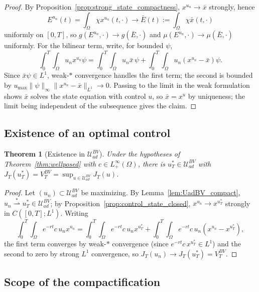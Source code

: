 \documentclass[pdflatex,sn-mathphys-num]{sn-jnl}
\newcommand{\Om}{\Omega}
\newcommand{\UadBV}{\mathcal{U}_{ad}^{BV}}
\theoremstyle{plain}
\newtheorem{theorem}{Theorem}[section]
\theoremstyle{definition}
\theoremstyle{remark}
\begin{document}
\begin{proof}
By Proposition~\ref{prop:strong_state_compactness}, $x^{u_n}\to\bar x$ strongly,
hence
\[
E^{u_n}(t)=\int_\Om\chi x^{u_n}(t,\cdot)
\longrightarrow
\bar E(t):=\int_\Om\chi\bar x(t,\cdot)
\]
uniformly on $[0,T]$, so $g(E^{u_n},\cdot)\to g(\bar E,\cdot)$ and
$\mu(E^{u_n},\cdot)\to\mu(\bar E,\cdot)$ uniformly. For the bilinear term, write,
for bounded $\psi$,
\[
\int_0^T\!\!\int_\Om u_n x^{u_n}\psi
=
\int_0^T\!\!\int_\Om u_n\bar x\,\psi
+\int_0^T\!\!\int_\Om u_n(x^{u_n}-\bar x)\psi.
\]
Since $\bar x\psi\in L^1$, weak-$\ast$ convergence handles the first term; the
second is bounded by $u_{\max}\|\psi\|_\infty\|x^{u_n}-\bar x\|_{L^1}\to0$. Passing
to the limit in the weak formulation shows $\bar x$ solves the state equation with
control $u$, so $\bar x=x^u$ by uniqueness; the limit being independent of the
subsequence gives the claim.
\end{proof}

\subsection{Existence of an optimal control}
\label{subsec:optimal_existence}

\begin{theorem}[Existence in $\UadBV$]
\label{thm:optimal_existence_BV}
Under the hypotheses of Theorem~\ref{thm:wellposed} with $c\in L^\infty_+(\Om)$,
there is $u_T^*\in\UadBV$ with
$J_T(u_T^*)=V_T^{BV}=\sup_{u\in\UadBV}J_T(u)$.
\end{theorem}

\begin{proof}
Let $(u_n)\subset\UadBV$ be maximizing. By Lemma~\ref{lem:UadBV_compact},
$u_n\overset{\ast}{\rightharpoonup}u_T^*\in\UadBV$; by
Proposition~\ref{prop:control_state_closed}, $x^{u_n}\to x^{u_T^*}$ strongly in
$C([0,T];L^1)$. Writing
\[
\int_0^T\!\!\int_\Om e^{-rt}c\,u_n x^{u_n}
=\int_0^T\!\!\int_\Om e^{-rt}c\,u_n x^{u_T^*}
+\int_0^T\!\!\int_\Om e^{-rt}c\,u_n(x^{u_n}-x^{u_T^*}),
\]
the first term converges by weak-$\ast$ convergence (since
$e^{-rt}c\,x^{u_T^*}\in L^1$) and the second to zero by strong $L^1$ convergence,
so $J_T(u_n)\to J_T(u_T^*)=V_T^{BV}$.
\end{proof}

\subsection{Scope of the compactification}
\label{subsec:compactification_scope}
\end{document}
